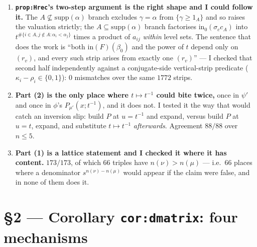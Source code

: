 \documentclass[11pt]{article}
\begin{document}
\begin{enumerate}[leftmargin=1.4em]
\item \textbf{\texttt{prop:Hrec}'s two-step argument is the right shape and I could follow it.}
The $A\not\subseteq\mathrm{supp}(\alpha)$ branch excludes $\gamma=\alpha$ from $\{\gamma\ge1_A\}$ and
so raises the valuation strictly; the $A\subseteq\mathrm{supp}(\alpha)$ branch factorises
$\mathrm{in}_0(\sigma_cc_A)$ into $t^{\#\{i\in A,j\notin A:\alpha_i<\alpha_j\}}$ times a product of
$a_{ij}$ \emph{within} level sets. The sentence that does the work is ``both $\mathrm{in}(F)(\beta_0)$
and the power of $t$ depend only on $(r_v)$, and every such strip arises from exactly one $(r_v)$'' ---
I checked that second half independently against a conjugate-side vertical-strip predicate
($\kappa_i-\rho_i\in\{0,1\}$): $0$ mismatches over the same $1772$ strips.
\item \textbf{Part (2) is the only place where $t\mapsto t^{-1}$ could bite twice,} once in $\psi'$ and
once in $\phi$'s $P_{\mu'}(x;t^{-1})$, and it does not. I tested it the way that would catch an
inversion slip: build $P$ at $u=t^{-1}$ and expand, versus build $P$ at $u=t$, expand, and substitute
$t\mapsto t^{-1}$ \emph{afterwards}. Agreement $88/88$ over $n\le5$.
\item \textbf{Part (1) is a lattice statement and I checked it where it has content.} $173/173$, of
which $66$ triples have $n(\nu)>n(\mu)$ --- i.e.\ $66$ places where a denominator $s^{n(\nu)-n(\mu)}$
would appear if the claim were false, and in none of them does it.
\end{enumerate}

\section{\S2 --- Corollary \texttt{cor:dmatrix}: four mechanisms}
\end{document}
